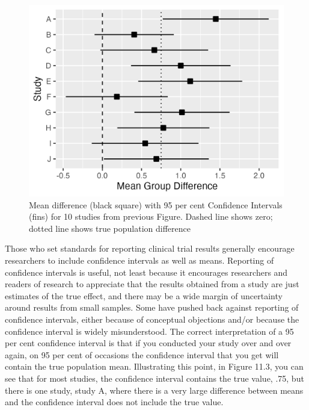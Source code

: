 \documentclass{krantz}
\begin{document}
\begin{center}
\begin{figure}
\includegraphics[width=0.75\linewidth]{images_bw/carbo10CI} \caption{Mean difference (black square) with 95 per cent Confidence Intervals (fins) for 10 studies from previous Figure. Dashed line shows zero; dotted line shows true population difference}\label{fig:ciplot}
\end{figure}
\end{center}

\begin{tcolorbox}[colback=Black!5!lightgray,colframe=black!75!black,coltitle=white,title=Reporting of confidence intervals]
Those who set standards for reporting clinical trial results generally encourage researchers to include confidence intervals as well as means. Reporting of confidence intervals is useful, not least because it encourages researchers and readers of research to appreciate that the results obtained from a study are just estimates of the true effect, and there may be a wide margin of uncertainty around results from small samples.  Some have pushed back against reporting of confidence intervals, either because of conceptual objections and/or because the confidence interval is widely misunderstood. The correct interpretation of a 95 per cent confidence interval is that if you conducted your study over and over again, on 95 per cent of occasions the confidence interval that you get will contain the true population mean. Illustrating this point, in Figure 11.3, you can see that for most studies, the confidence interval contains the true value, .75, but there is one study, study A, where there is a very large difference between means and the confidence interval does not include the true value. 
\end{tcolorbox}
\end{document}
